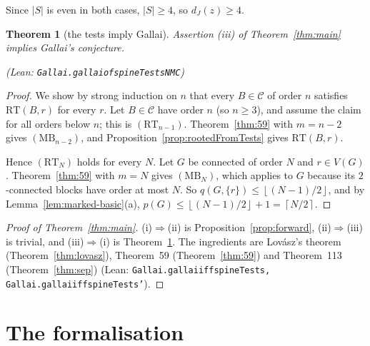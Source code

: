 \documentclass[11pt]{amsart}
\newtheorem{theorem}{Theorem}[section]
\theoremstyle{definition}
\theoremstyle{remark}
\renewcommand{\_}{\oldunderscore\allowbreak}
\newcommand{\lean}[1]{\textup{(Lean: {\small\texttt{#1}})}}
\newcommand{\leanst}[1]{\par{\raggedright\small\textup{(Lean: \texttt{#1})}\par}}
\newcommand{\cC}{\mathcal{C}}
\newcommand{\fl}[1]{\left\lfloor #1\right\rfloor}
\newcommand{\cl}[1]{\left\lceil #1\right\rceil}
\newcommand{\MBU}{\mathrm{MB}}
\newcommand{\RT}{\mathrm{RT}}
\begin{document}
Since $|S|$ is even in both cases, $|S|\ge4$, so $d_J(z)\ge4$.

\begin{theorem}[the tests imply Gallai]\label{thm:converse}
Assertion \textup{(iii)} of Theorem~\ref{thm:main} implies Gallai's conjecture.
\leanst{Gallai.gallai\_of\_spineTestsNMC}
\end{theorem}

\begin{proof}
We show by strong induction on $n$ that every $B\in\cC$ of order $n$ satisfies $\RT(B,r)$ for every
$r$. Let $B\in\cC$ have order $n$ (so $n\ge3$), and assume the claim for all orders below $n$; this
is $(\RT_{n-1})$. Theorem~\ref{thm:59} with $m=n-2$ gives $(\MBU_{n-2})$, and
Proposition~\ref{prop:rootedFromTests} gives $\RT(B,r)$.

Hence $(\RT_N)$ holds for every $N$. Let $G$ be connected of order $N$ and $r\in V(G)$.
Theorem~\ref{thm:59} with $m=N$ gives $(\MBU_N)$, which applies to $G$ because its $2$-connected
blocks have order at most $N$. So $q(G,\{r\})\le\fl{(N-1)/2}$, and by
Lemma~\ref{lem:marked-basic}(a), $p(G)\le\fl{(N-1)/2}+1=\cl{N/2}$.
\end{proof}

\begin{proof}[Proof of Theorem~\ref{thm:main}]
(i)$\Rightarrow$(ii) is Proposition~\ref{prop:forward}, (ii)$\Rightarrow$(iii) is trivial, and
(iii)$\Rightarrow$(i) is Theorem~\ref{thm:converse}. The ingredients are Lov\'asz's theorem
(Theorem~\ref{thm:lovasz}), Theorem~59 (Theorem~\ref{thm:59}) and Theorem~113
(Theorem~\ref{thm:sep}) \lean{Gallai.gallai\_iff\_spineTests, Gallai.gallai\_iff\_spineTests'}.
\end{proof}

\section{The formalisation}\label{sec:lean}
\end{document}
